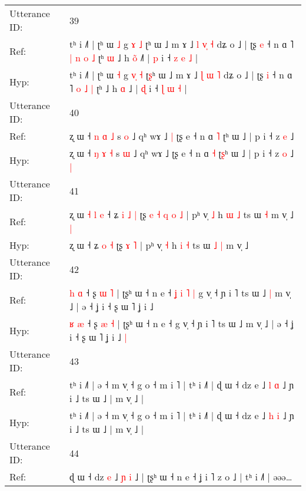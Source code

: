 \documentclass[10pt]{article}
\DeclareRobustCommand{\hl}[1]{{\textcolor{red}{#1}}}
\begin{document}
\begin{longtable}{ll}
 \\
\midrule
Utterance ID: & 39 \\
Ref: & tʰ i ˩˥ | ʈʰ ɯ \hl{˩} g \hl{}\hl{ɤ} \hl{˩} ʈ\hl{}ʰ ɯ ˩ m ɤ ˩ \hl{l} \hl{v}\hl{̩} \hl{˧} dʑ o ˩ | ʈʂ \hl{e} ˧ n ɑ ˥\hl{ }\hl{|} \hl{n} \hl{o} \hl{˩} ʈʰ\hl{ }\hl{ɯ} ˩ h \hl{o}\hl{̃} ˩\hl{˥} | \hl{p} i ˧ \hl{z} \hl{e} \hl{˩} |
 \\
Hyp: & tʰ i ˩˥ | ʈʰ ɯ \hl{˧} g \hl{v}\hl{̩} \hl{˧} ʈ\hl{ʂ}ʰ ɯ ˩ m ɤ ˩ \hl{ɭ} \hl{}\hl{ɯ} \hl{˥} dʑ o ˩ | ʈʂ \hl{i} ˧ n ɑ ˥\hl{}\hl{} \hl{o} \hl{˩} \hl{|} ʈʰ\hl{}\hl{} ˩ h \hl{}\hl{ɑ} ˩\hl{} | \hl{ɖ} i ˧ \hl{ɭ} \hl{ɯ} \hl{˧} |
 \\
\midrule
Utterance ID: & 40 \\
Ref: & ʐ ɯ ˧ \hl{n} \hl{ɑ} \hl{˩} s \hl{o} ˩ qʰ wɤ ˩\hl{ }\hl{|} ʈʂ e ˧ n ɑ \hl{˥} ʈ\hl{}ʰ ɯ ˩ | p i ˧ z \hl{e} ˩\hl{}\hl{}
 \\
Hyp: & ʐ ɯ ˧ \hl{ŋ} \hl{ɤ} \hl{˧} s \hl{ɯ} ˩ qʰ wɤ ˩\hl{}\hl{} ʈʂ e ˧ n ɑ \hl{˧} ʈ\hl{ʂ}ʰ ɯ ˩ | p i ˧ z \hl{o} ˩\hl{ }\hl{|}
 \\
\midrule
Utterance ID: & 41 \\
Ref: & ʐ ɯ\hl{ }\hl{˧}\hl{ }\hl{l}\hl{ }\hl{e} ˧ ʑ\hl{ }\hl{i} \hl{˩} \hl{|} ʈʂ\hl{ }\hl{e}\hl{ }\hl{˧}\hl{ }\hl{q} \hl{o} \hl{˩} | pʰ v̩ \hl{˩} h \hl{ɯ} \hl{˩} ts ɯ\hl{}\hl{} \hl{˧} m v̩ ˩\hl{ }\hl{|}
 \\
Hyp: & ʐ ɯ\hl{}\hl{}\hl{}\hl{}\hl{}\hl{} ˧ ʑ\hl{}\hl{} \hl{o} \hl{˧} ʈʂ\hl{}\hl{}\hl{}\hl{}\hl{}\hl{} \hl{ɤ} \hl{˥} | pʰ v̩ \hl{˧} h \hl{i} \hl{˧} ts ɯ\hl{ }\hl{˩} \hl{|} m v̩ ˩\hl{}\hl{}
 \\
\midrule
Utterance ID: & 42 \\
Ref: & \hl{h} \hl{ɑ} ˧ ʂ \hl{ɯ} \hl{˥} | ʈʂʰ ɯ ˧ n e ˧\hl{ }\hl{ʝ}\hl{ }\hl{i}\hl{ }\hl{˥}\hl{ }\hl{|} g v̩ ˧ ɲ i ˥ ts ɯ ˩\hl{ }\hl{|} m v̩ ˩ | ə ˧ ʝ i ˧ ʂ ɯ ˥ ʝ i ˩\hl{}\hl{}
 \\
Hyp: & \hl{ʁ} \hl{æ} ˧ ʂ \hl{æ} \hl{˧} | ʈʂʰ ɯ ˧ n e ˧\hl{}\hl{}\hl{}\hl{}\hl{}\hl{}\hl{}\hl{} g v̩ ˧ ɲ i ˥ ts ɯ ˩\hl{}\hl{} m v̩ ˩ | ə ˧ ʝ i ˧ ʂ ɯ ˥ ʝ i ˩\hl{ }\hl{|}
 \\
\midrule
Utterance ID: & 43 \\
Ref: & tʰ i ˩˥ | ə ˧ m v̩ ˧ g o ˧ m i ˥ | tʰ i ˩˥ | ɖ ɯ ˧ dz e ˩ \hl{l} \hl{ɑ} ˩ ɲ i ˩ ts ɯ ˩ | m v̩ ˩ |
 \\
Hyp: & tʰ i ˩˥ | ə ˧ m v̩ ˧ g o ˧ m i ˥ | tʰ i ˩˥ | ɖ ɯ ˧ dz e ˩ \hl{h} \hl{i} ˩ ɲ i ˩ ts ɯ ˩ | m v̩ ˩ |
 \\
\midrule
Utterance ID: & 44 \\
Ref: & ɖ ɯ ˧ dz \hl{e} ˩ \hl{ɲ}\hl{ }\hl{i} ˩ | ʈʂʰ ɯ ˧ n e ˧ ʝ i ˥ z o ˩ | tʰ i ˩˥ | əəə…

\end{longtable}
\end{document}
